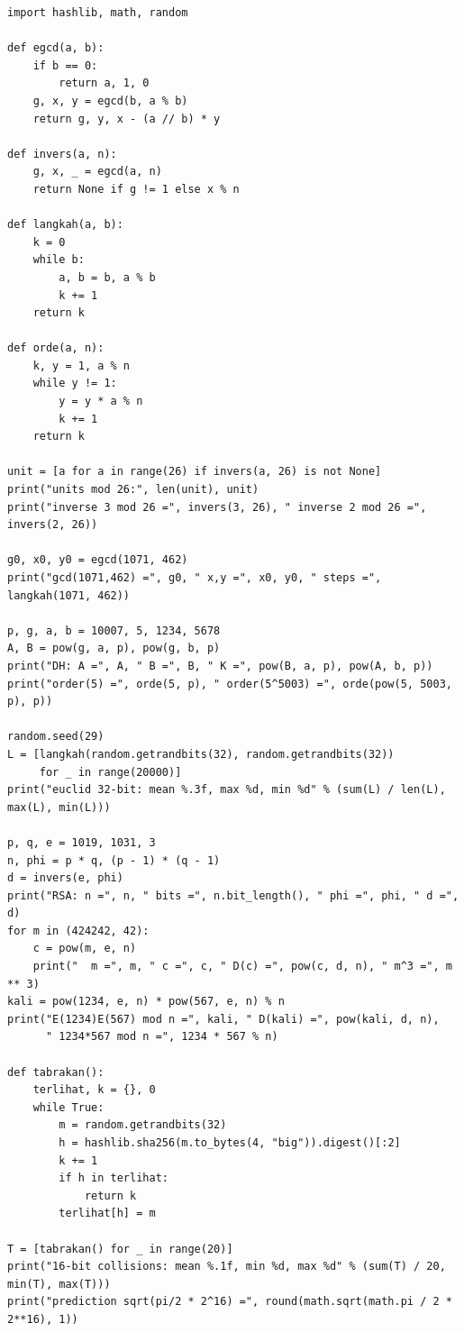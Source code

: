 \begin{lab}
\begin{verbatim}
import hashlib, math, random

def egcd(a, b):
    if b == 0:
        return a, 1, 0
    g, x, y = egcd(b, a % b)
    return g, y, x - (a // b) * y

def invers(a, n):
    g, x, _ = egcd(a, n)
    return None if g != 1 else x % n

def langkah(a, b):
    k = 0
    while b:
        a, b = b, a % b
        k += 1
    return k

def orde(a, n):
    k, y = 1, a % n
    while y != 1:
        y = y * a % n
        k += 1
    return k

unit = [a for a in range(26) if invers(a, 26) is not None]
print("units mod 26:", len(unit), unit)
print("inverse 3 mod 26 =", invers(3, 26), " inverse 2 mod 26 =", invers(2, 26))

g0, x0, y0 = egcd(1071, 462)
print("gcd(1071,462) =", g0, " x,y =", x0, y0, " steps =", langkah(1071, 462))

p, g, a, b = 10007, 5, 1234, 5678
A, B = pow(g, a, p), pow(g, b, p)
print("DH: A =", A, " B =", B, " K =", pow(B, a, p), pow(A, b, p))
print("order(5) =", orde(5, p), " order(5^5003) =", orde(pow(5, 5003, p), p))

random.seed(29)
L = [langkah(random.getrandbits(32), random.getrandbits(32))
     for _ in range(20000)]
print("euclid 32-bit: mean %.3f, max %d, min %d" % (sum(L) / len(L), max(L), min(L)))

p, q, e = 1019, 1031, 3
n, phi = p * q, (p - 1) * (q - 1)
d = invers(e, phi)
print("RSA: n =", n, " bits =", n.bit_length(), " phi =", phi, " d =", d)
for m in (424242, 42):
    c = pow(m, e, n)
    print("  m =", m, " c =", c, " D(c) =", pow(c, d, n), " m^3 =", m ** 3)
kali = pow(1234, e, n) * pow(567, e, n) % n
print("E(1234)E(567) mod n =", kali, " D(kali) =", pow(kali, d, n),
      " 1234*567 mod n =", 1234 * 567 % n)

def tabrakan():
    terlihat, k = {}, 0
    while True:
        m = random.getrandbits(32)
        h = hashlib.sha256(m.to_bytes(4, "big")).digest()[:2]
        k += 1
        if h in terlihat:
            return k
        terlihat[h] = m

T = [tabrakan() for _ in range(20)]
print("16-bit collisions: mean %.1f, min %d, max %d" % (sum(T) / 20, min(T), max(T)))
print("prediction sqrt(pi/2 * 2^16) =", round(math.sqrt(math.pi / 2 * 2**16), 1))
\end{verbatim}


\end{lab}
